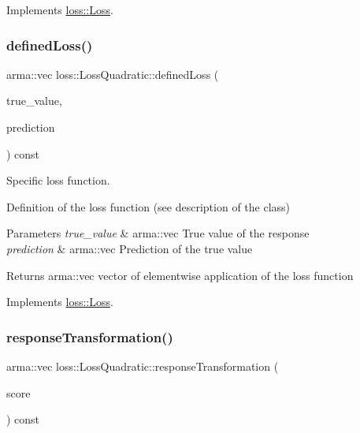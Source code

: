 Implements \mbox{\hyperlink{classloss_1_1_loss_a267a4de70747ade4b2d84ce35a448979}{loss\+::\+Loss}}.

\mbox{\label{classloss_1_1_loss_quadratic_a7495a0d225ae5470840e8f377419d7cf}} 
\subsubsection{\texorpdfstring{defined\+Loss()}{definedLoss()}}
{\footnotesize\ttfamily arma\+::vec loss\+::\+Loss\+Quadratic\+::defined\+Loss (\begin{DoxyParamCaption}\item[{const arma\+::vec \&}]{true\+\_\+value,  }\item[{const arma\+::vec \&}]{prediction }\end{DoxyParamCaption}) const\hspace{0.3cm}{\ttfamily [virtual]}}



Specific loss function. 

Definition of the loss function (see description of the class)


\begin{DoxyParams}{Parameters}
{\em true\+\_\+value} & {\ttfamily arma\+::vec} True value of the response \\
\hline
{\em prediction} & {\ttfamily arma\+::vec} Prediction of the true value\\
\hline
\end{DoxyParams}
\begin{DoxyReturn}{Returns}
{\ttfamily arma\+::vec} vector of elementwise application of the loss function 
\end{DoxyReturn}


Implements \mbox{\hyperlink{classloss_1_1_loss_ae9f94dd9b8311397583ba3a9cb485e94}{loss\+::\+Loss}}.

\mbox{\label{classloss_1_1_loss_quadratic_a2534e3ec615acd6d0c80c2dbcfb8c1e9}} 
\subsubsection{\texorpdfstring{response\+Transformation()}{responseTransformation()}}
{\footnotesize\ttfamily arma\+::vec loss\+::\+Loss\+Quadratic\+::response\+Transformation (\begin{DoxyParamCaption}\item[{const arma\+::vec \&}]{score }\end{DoxyParamCaption}) const\hspace{0.3cm}{\ttfamily [virtual]}}



